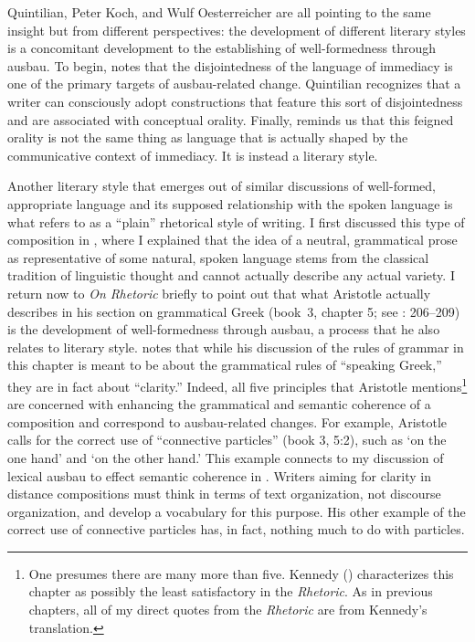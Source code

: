 Quintilian, Peter Koch, and Wulf Oesterreicher are all pointing to the same insight but from different perspectives: the development of different literary styles is a concomitant development to the establishing of well-formedness through ausbau. To begin, \citet{KochOesterreicher1994} notes that the disjointedness of the language of immediacy is one of the primary targets of ausbau-related change. Quintilian recognizes that a writer can consciously adopt constructions that feature this sort of disjointedness and are associated with conceptual orality. Finally, \citet{Oesterreicher1997} reminds us that this feigned orality is not the same thing as language that is actually shaped by the communicative context of immediacy. It is instead a literary style.

Another literary style that emerges out of similar discussions of well-formed, appropriate language and its supposed relationship with the spoken language is what \citet[204--205]{Oesterreicher1997} refers to as a “plain” rhetorical style of writing. I first discussed this type of composition in , where I explained that the idea of a neutral, grammatical prose as representative of some natural, spoken language stems from the classical tradition of linguistic thought and cannot actually describe any actual variety. I return now to \textit{On Rhetoric} briefly to point out that what Aristotle actually describes in his section on grammatical Greek (book~3, chapter 5; see \citealt{Kennedy2007}: 206--209) is the development of well-formedness through ausbau, a process that he also relates to literary style. \citet[206]{Kennedy2007} notes that while his discussion of the rules of grammar in this chapter is meant to be about the grammatical rules of “speaking Greek,” they are in fact about “clarity.” Indeed, all five principles that Aristotle mentions\footnote{{One presumes there are many more than five. Kennedy (\citealt[207, fn. 58]{Aristotle2007}) characterizes this chapter as possibly the least satisfactory in the} {\textit{Rhetoric}}{. As in previous chapters, all of my direct quotes from the} {\textit{Rhetoric}} {are from Kennedy’s translation.} } are concerned with enhancing the grammatical and semantic coherence of a composition and correspond to ausbau-related changes. For example, Aristotle calls for the correct use of “connective particles” (book 3, 5:2), such as ‘on the one hand’ and ‘on the other hand.’ This example connects to my discussion of lexical ausbau to effect semantic coherence in . Writers aiming for clarity in distance compositions must think in terms of text organization, not discourse organization, and develop a vocabulary for this purpose. His other example of the correct use of connective particles has, in fact, nothing much to do with particles.

